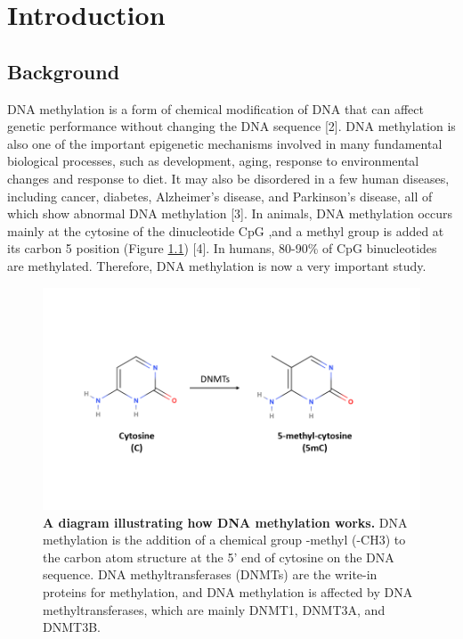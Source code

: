\documentclass{PHlab-thesis}
\begin{document}
\printnomenclature[5cm]

\newpage
\setcounter{page}{1}



\chapter{Introduction}
\section{Background}
DNA methylation is a form of chemical modification of DNA that can affect genetic performance without changing the DNA sequence [2]. DNA methylation is also one of the important epigenetic mechanisms involved in many fundamental biological processes, such as development, aging, response to environmental changes and response to diet. It may also be disordered in a few human diseases, including cancer, diabetes, Alzheimer’s disease, and Parkinson’s disease, all of which show abnormal DNA methylation [3]. In animals, DNA methylation occurs mainly at the cytosine of the dinucleotide CpG ,and a methyl group is added at its carbon 5 position (Figure \ref{f1}) [4]. In humans, 80-90\% of CpG binucleotides are methylated. Therefore, DNA methylation is now a very important study.

\begin{figure}[h!]
  \centering
  \includegraphics[scale=0.8]{figures/dna_methylation.png}
  \caption{\textbf{A diagram illustrating how DNA methylation works.}
  DNA methylation is the addition of a chemical group -methyl (-CH3) to the carbon atom structure at the 5' end of cytosine on the DNA sequence. DNA methyltransferases (DNMTs) are the write-in proteins for methylation, and DNA methylation is affected by DNA methyltransferases, which are mainly DNMT1, DNMT3A, and DNMT3B. }
  \label{f1}
\end{figure}
\end{document}
